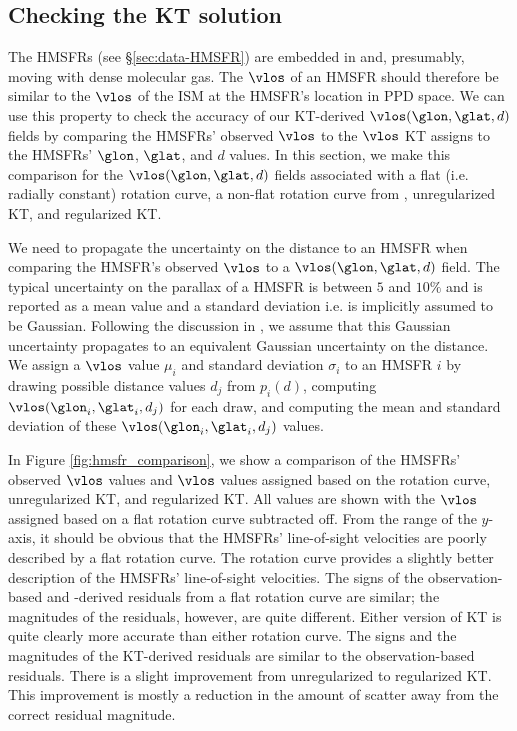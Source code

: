 \subsection{Checking the KT solution}
\label{sec:KT-validation}
The \Reid{} HMSFRs (see \S \ref{sec:data-HMSFR}) are embedded in and, presumably, moving with dense molecular gas.
The $\vlos$ of an HMSFR should therefore be similar to the $\vlos$ of the ISM at the HMSFR's location in PPD space.
We can use this property to check the accuracy of our KT-derived $\vlos(\glon, \glat, d)$ fields by comparing the HMSFRs' observed $\vlos$ to the $\vlos$ KT assigns to the HMSFRs' $\glon$, $\glat$, and $d$ values. 
In this section, we make this comparison for the $\vlos(\glon, \glat, d)$ fields associated with a flat (i.e. radially constant) rotation curve, a non-flat rotation curve from \citet{Clemens:1985dp}, unregularized KT, and regularized KT. 

We need to propagate the uncertainty on the distance to an HMSFR when comparing the HMSFR's observed $\vlos$ to a $\vlos(\glon, \glat, d)$ field.
The typical uncertainty on the parallax of a \Reid{} HMSFR is between $5$ and $10\%$ and is reported as a mean value and a standard deviation i.e. is implicitly assumed to be Gaussian. 
Following the discussion in \citet{2009ApJ...704.1704B}, we assume that this Gaussian uncertainty propagates to an equivalent Gaussian uncertainty on the distance.
We assign a $\vlos$ value $\mu_{i}$ and standard deviation $\sigma_{i}$ to an HMSFR $i$ by drawing possible distance values $d_j$ from $p_i(d)$, computing $\vlos(\glon_{i}, \glat_{i}, d_j)$ for each draw, and computing the mean and standard deviation of these $\vlos(\glon_{i}, \glat_{i}, d_j)$ values. 

In Figure \ref{fig:hmsfr_comparison}, we show a comparison of the HMSFRs' observed $\vlos$ values and $\vlos$ values assigned based on the \citet{Clemens:1985dp} rotation curve, unregularized KT, and regularized KT.
All values are shown with the $\vlos$ assigned based on a flat rotation curve subtracted off.
From the range of the $y$-axis, it should be obvious that the HMSFRs' line-of-sight velocities are  poorly described by a flat rotation curve.
The \citet{Clemens:1985dp} rotation curve provides a slightly better description of the HMSFRs' line-of-sight velocities.
The signs of the observation-based and \citet{Clemens:1985dp}-derived residuals from a flat rotation curve are similar; the magnitudes of the residuals, however, are quite different.
Either version of KT is quite clearly more accurate than either rotation curve.
The signs and the magnitudes of the KT-derived residuals are similar to the observation-based residuals.
There is a slight improvement from unregularized to regularized KT.
This improvement is mostly a reduction in the amount of scatter away from the correct residual magnitude. 


